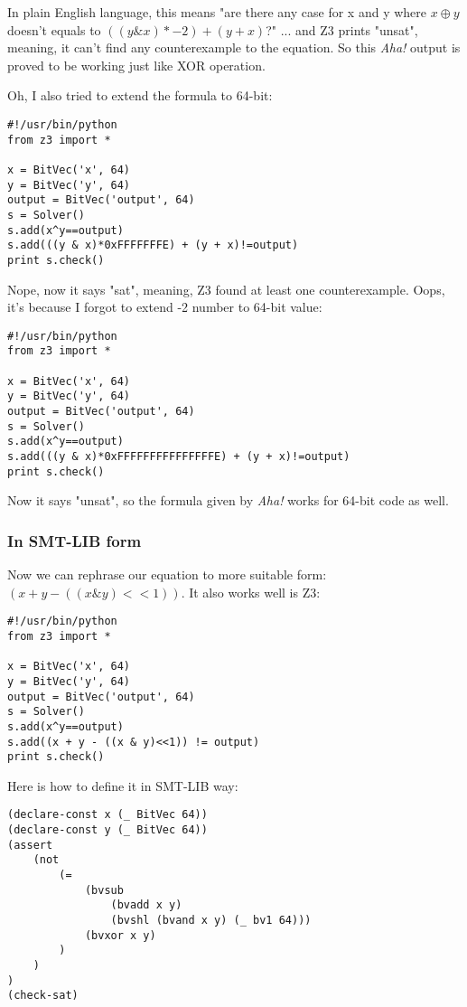 In plain English language, this means "are there any case for x and y where $x \oplus y$ doesn't equals to $((y \& x)*-2) + (y + x)$?"
... and Z3 prints "unsat", meaning, it can't find any counterexample to the equation.
So this \textit{Aha!} output is proved to be working just like XOR operation.

Oh, I also tried to extend the formula to 64-bit:

\begin{lstlisting}
#!/usr/bin/python
from z3 import *

x = BitVec('x', 64)
y = BitVec('y', 64)
output = BitVec('output', 64)
s = Solver()
s.add(x^y==output)
s.add(((y & x)*0xFFFFFFFE) + (y + x)!=output)
print s.check()
\end{lstlisting}

Nope, now it says "sat", meaning, Z3 found at least one counterexample.
Oops, it's because I forgot to extend -2 number to 64-bit value:

\begin{lstlisting}
#!/usr/bin/python
from z3 import *

x = BitVec('x', 64)
y = BitVec('y', 64)
output = BitVec('output', 64)
s = Solver()
s.add(x^y==output)
s.add(((y & x)*0xFFFFFFFFFFFFFFFE) + (y + x)!=output)
print s.check()
\end{lstlisting}

Now it says "unsat", so the formula given by \textit{Aha!} works for 64-bit code as well.

\subsubsection{In SMT-LIB form}

Now we can rephrase our equation to more suitable form: $(x + y - ((x \& y)<<1))$.
It also works well is Z3:

\begin{lstlisting}
#!/usr/bin/python
from z3 import *

x = BitVec('x', 64)
y = BitVec('y', 64)
output = BitVec('output', 64)
s = Solver()
s.add(x^y==output)
s.add((x + y - ((x & y)<<1)) != output)
print s.check()
\end{lstlisting}

Here is how to define it in SMT-LIB way:

\begin{lstlisting}
(declare-const x (_ BitVec 64))
(declare-const y (_ BitVec 64))
(assert 
	(not
		(=
			(bvsub
				(bvadd x y)
				(bvshl (bvand x y) (_ bv1 64)))
			(bvxor x y)
		)
	)
)
(check-sat)
\end{lstlisting}

